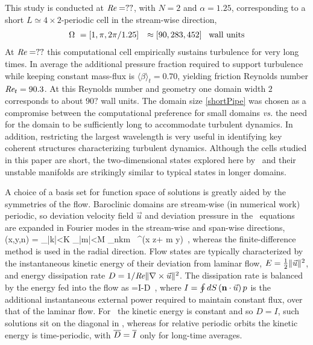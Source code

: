 This study is conducted at $\textit{Re} = ??$, with $N=2$ and
$\alpha=1.25$, corresponding to a short $L\simeq 4\times 2$-periodic
cell in
the stream-wise direction,
\begin{align}
\Omega~ &= [1,\pi,2\pi/1.25] &\approx [90, 283, 452] \;\;\;
\text{wall units}
    \label{shortPipe}
\end{align}
At
$\textit{Re} = ??$ this computational cell empirically sustains
turbulence for very long times. In average the additional pressure
fraction required to support turbulence while keeping constant mass-flux
is $\langle\beta\rangle_t=0.70$, yielding friction Reynolds number
$\textit{Re}_{t}=90.3$.  At this Reynolds number and geometry one domain
width $2$ corresponds to about $90?$ wall units. The domain size
\eqref{shortPipe} was chosen as a compromise between the computational
preference for small domains {\em vs.} the need for the domain to be
sufficiently long to accommodate turbulent dynamics. In addition,
restricting the largest wavelength is very useful in identifying key
coherent structures characterizing turbulent dynamics.
Although the cells studied in this paper are short, the two-dimensional
states explored here  by \eqva\ and their unstable manifolds are
strikingly similar to typical states in longer domains.


A choice of a basis set for function space of solutions is greatly aided
by the symmetries of the flow. Baroclinic domains are stream-wise (in
numerical work) periodic, so deviation velocity field $\vec{u}$ and
deviation pressure in the \NS\ equations  are
expanded in Fourier modes in the stream-wise and span-wise directions,
\beq
{}(x,y,n) = \sum_{|k|<K} \sum_{|m|<M} _{nkm}
\, ^{(\alpha x z+ m y)}
\,,
whereas the finite-difference method is used in the radial direction.
Flow states are typically characterized by the instantaneous kinetic
energy of their deviation from laminar flow, $E = \frac{1}{2}
\|{\vec{u}}\|^2$, and energy dissipation rate $D =
1/\textit{Re}\|{{\boldmath \nabla} \times \vec{u}}\|^2$. The dissipation rate is
balanced by the energy fed into the flow as
\beq
{}=I-D
\,,
where
\(
I =\oint dS \, ({\bf n}\cdot\vec{u})\, p
\)
is the additional instantaneous external power required to maintain
constant flux, over that of the laminar flow.  For \reqva\ the kinetic
energy is constant and so $D=I$, such solutions sit on the diagonal in
, whereas for relative periodic orbits the kinetic
energy is time-periodic, with $\overline{D}=\overline{I}$ only for
long-time averages.

